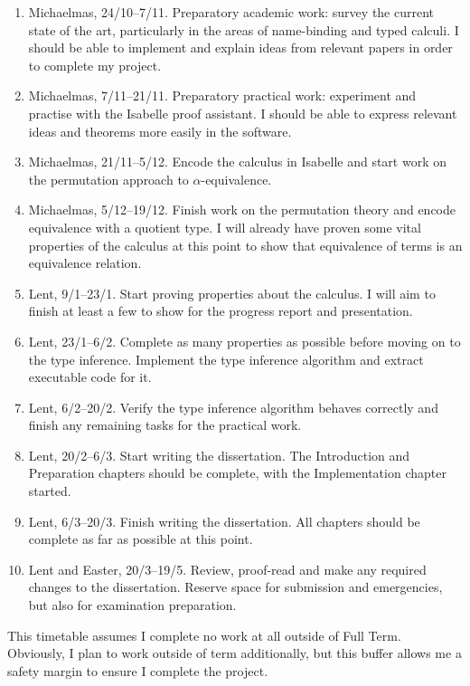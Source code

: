 \documentclass[12pt]{article}
\begin{document}
\begin{enumerate}
\item
Michaelmas, 24/10--7/11.
Preparatory academic work: survey the current state of the art, particularly in the areas of name-binding and typed calculi.
I should be able to implement and explain ideas from relevant papers in order to complete my project.
\item
Michaelmas, 7/11--21/11.
Preparatory practical work: experiment and practise with the Isabelle proof assistant.
I should be able to express relevant ideas and theorems more easily in the software.
\item
Michaelmas, 21/11--5/12.
Encode the calculus in Isabelle and start work on the permutation approach to \(\alpha\)-equivalence.
\item
Michaelmas, 5/12--19/12.
Finish work on the permutation theory and encode equivalence with a quotient type.
I will already have proven some vital properties of the calculus at this point to show that equivalence of terms is an equivalence relation.
\item
Lent, 9/1--23/1.
Start proving properties about the calculus.
I will aim to finish at least a few to show for the progress report and presentation.
\item
Lent, 23/1--6/2.
Complete as many properties as possible before moving on to the type inference.
Implement the type inference algorithm and extract executable code for it.
\item
Lent, 6/2--20/2.
Verify the type inference algorithm behaves correctly and finish any remaining tasks for the practical work.
\item
Lent, 20/2--6/3.
Start writing the dissertation.
The Introduction and Preparation chapters should be complete, with the Implementation chapter started.
\item
Lent, 6/3--20/3.
Finish writing the dissertation.
All chapters should be complete as far as possible at this point.
\item
Lent and Easter, 20/3--19/5.
Review, proof-read and make any required changes to the dissertation.
Reserve space for submission and emergencies,
but also for examination preparation.
\end{enumerate}

This timetable assumes I complete no work at all outside of Full Term. 
Obviously, I plan to work outside of term additionally, but this buffer allows me a safety margin to ensure I complete the project.
\end{document}
